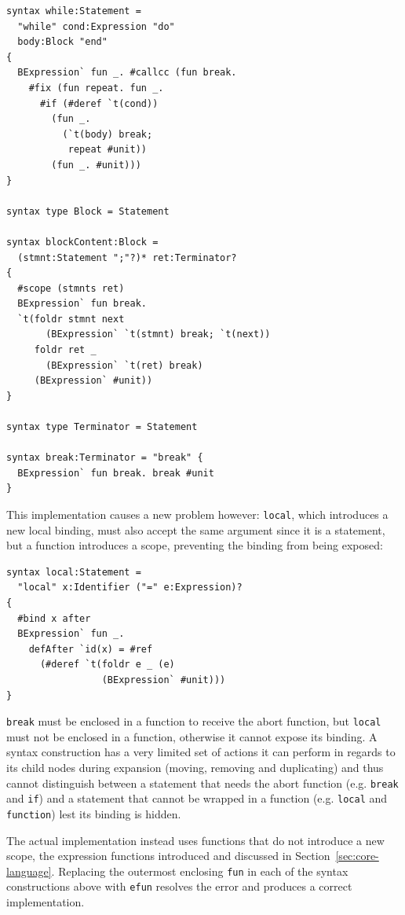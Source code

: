 \documentclass{kththesis}
\begin{document}
\begin{verbatim}
syntax while:Statement =
  "while" cond:Expression "do"
  body:Block "end"
{
  BExpression` fun _. #callcc (fun break.
    #fix (fun repeat. fun _.
      #if (#deref `t(cond))
        (fun _.
          (`t(body) break;
           repeat #unit))
        (fun _. #unit)))
}

syntax type Block = Statement

syntax blockContent:Block =
  (stmnt:Statement ";"?)* ret:Terminator?
{
  #scope (stmnts ret)
  BExpression` fun break.
  `t(foldr stmnt next
       (BExpression` `t(stmnt) break; `t(next))
     foldr ret _
       (BExpression` `t(ret) break)
     (BExpression` #unit))
}

syntax type Terminator = Statement

syntax break:Terminator = "break" {
  BExpression` fun break. break #unit
}
\end{verbatim}

This implementation causes a new problem however: \texttt{local}, which introduces a new local binding, must also accept the same argument since it is a statement, but a function introduces a scope, preventing the binding from being exposed:

\begin{verbatim}
syntax local:Statement =
  "local" x:Identifier ("=" e:Expression)?
{
  #bind x after
  BExpression` fun _.
    defAfter `id(x) = #ref
      (#deref `t(foldr e _ (e)
                 (BExpression` #unit)))
}
\end{verbatim}

\texttt{break} must be enclosed in a function to receive the abort function, but \texttt{local} must not be enclosed in a function, otherwise it cannot expose its binding. A syntax construction has a very limited set of actions it can perform in regards to its child nodes during expansion (moving, removing and duplicating) and thus cannot distinguish between a statement that needs the abort function (e.g. \texttt{break} and \texttt{if}) and a statement that cannot be wrapped in a function (e.g. \texttt{local} and \texttt{function}) lest its binding is hidden.

The actual implementation instead uses functions that do not introduce a new scope, the expression functions introduced and discussed in Section~\ref{sec:core-language}. Replacing the outermost enclosing \texttt{fun} in each of the syntax constructions above with \texttt{efun} resolves the error and produces a correct implementation.
\end{document}
